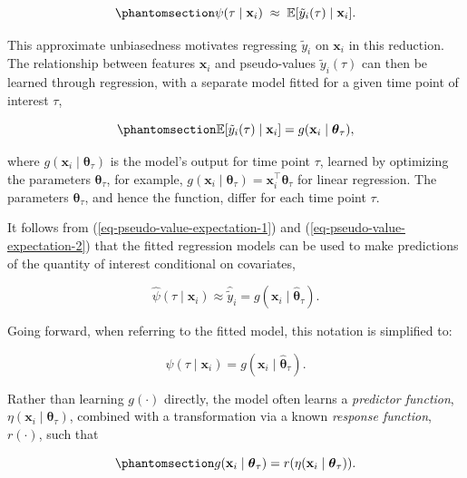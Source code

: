\documentclass[
  letterpaper,
  krantz2]{style/krantz}
\begin{document}
\begin{equation}\phantomsection\label{eq-pseudo-value-expectation-1}{
\psi(\tau \mid \mathbf{x}_i) \;\approx\; \mathbb{E}[\tilde{y}_i(\tau) \mid \mathbf{x}_i].
}\end{equation}

This approximate unbiasedness motivates regressing \(\tilde{y}_i\) on
\(\mathbf{x}_i\) in this reduction. The relationship between features
\(\mathbf{x}_i\) and pseudo-values \(\tilde{y}_i(\tau)\) can then be
learned through regression, with a separate model fitted for a given
time point of interest \(\tau\),

\begin{equation}\phantomsection\label{eq-pseudo-value-expectation-2}{
\mathbb{E}[\tilde{y}_i(\tau)\mid\mathbf{x}_i] = g(\mathbf{x}_i\mid\boldsymbol{\theta}_\tau),
}\end{equation}

where \(g(\mathbf{x}_i\mid \boldsymbol{\theta}_\tau)\) is the model's
output for time point \(\tau\), learned by optimizing the parameters
\(\boldsymbol{\theta}_\tau\), for example,
\(g(\mathbf{x}_i\mid \boldsymbol{\theta}_\tau) = \mathbf{x}_i^\top\boldsymbol{\theta}_\tau\)
for linear regression. The parameters
\(\boldsymbol{\theta}_\tau\), and hence the function, differ for each
time point \(\tau\).

It follows from (\ref{eq-pseudo-value-expectation-1}) and
(\ref{eq-pseudo-value-expectation-2}) that the fitted regression models
can be used to make predictions of the quantity of interest conditional
on covariates,

\[
\hat{\psi}(\tau\mid\mathbf{x}_i) \approx \hat{\tilde{y}}_i = g(\mathbf{x}_i\mid\hat{\boldsymbol{\theta}}_\tau).
\]

Going forward, when referring to the fitted model, this notation is
simplified to:

\[
\hat{\psi}(\tau \mid \mathbf{x}_i) = g(\mathbf{x}_i\mid\hat{\boldsymbol{\theta}}_\tau).
\]

Rather than learning \(g(\cdot)\) directly, the model often learns a
\emph{predictor function},
\(\eta(\mathbf{x}_i\mid\boldsymbol{\theta}_\tau)\), combined with a
transformation via a known \emph{response function}, \(r(\cdot)\), such
that

\begin{equation}\phantomsection\label{eq-pseudo-value-response-function}{
g(\mathbf{x}_i\mid\boldsymbol{\theta}_\tau) = r(\eta(\mathbf{x}_i\mid\boldsymbol{\theta}_\tau)).
}\end{equation}
\end{document}

